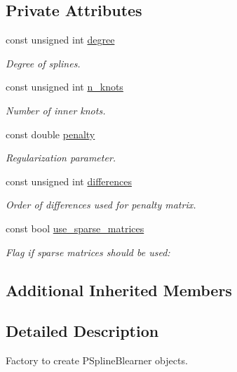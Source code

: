 \subsection*{Private Attributes}
\begin{DoxyCompactItemize}
\item 
const unsigned int \hyperlink{classblearnerfactory_1_1_baselearner_p_spline_factory_aa245143409b64073ba36700c6868ece5}{degree}
\begin{DoxyCompactList}\small\item\em Degree of splines. \end{DoxyCompactList}\item 
const unsigned int \hyperlink{classblearnerfactory_1_1_baselearner_p_spline_factory_a11e98fcad44d686df7be69d3176480f9}{n\+\_\+knots}
\begin{DoxyCompactList}\small\item\em Number of inner knots. \end{DoxyCompactList}\item 
const double \hyperlink{classblearnerfactory_1_1_baselearner_p_spline_factory_a09f6c5d718ae1ded72a21c6d270c3d32}{penalty}
\begin{DoxyCompactList}\small\item\em Regularization parameter. \end{DoxyCompactList}\item 
const unsigned int \hyperlink{classblearnerfactory_1_1_baselearner_p_spline_factory_a78e6dd2e69dd3782ac4082c04bcccdff}{differences}
\begin{DoxyCompactList}\small\item\em Order of differences used for penalty matrix. \end{DoxyCompactList}\item 
const bool \hyperlink{classblearnerfactory_1_1_baselearner_p_spline_factory_ac0e83c55bc1d631663f639fea394e253}{use\+\_\+sparse\+\_\+matrices}
\begin{DoxyCompactList}\small\item\em Flag if sparse matrices should be used\+: \end{DoxyCompactList}\end{DoxyCompactItemize}
\subsection*{Additional Inherited Members}


\subsection{Detailed Description}
Factory to create {\ttfamily P\+Spline\+Blearner} objects. 

